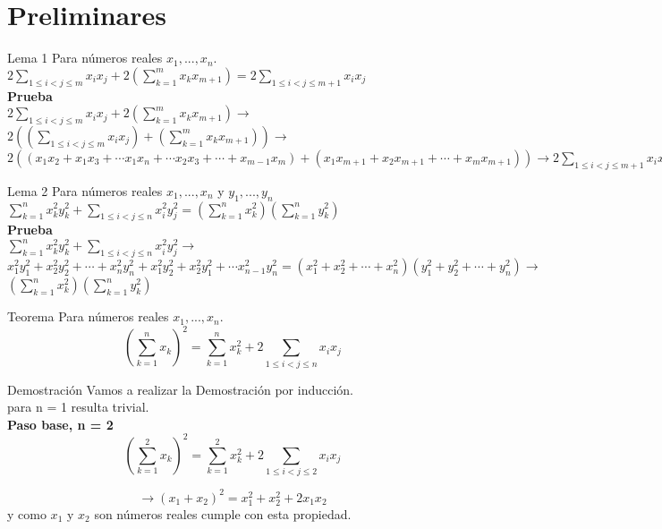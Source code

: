 \section{Preliminares}

\begin{frame}{Lema 1}
Para números reales $x_{1},...,x_{n}$.
$2 \sum_{1 \leq i<j \leq m}x_{i}x_{j} + 2(\sum_{k=1}^{m} x_{k}x_{m+1}) = 2 \sum_{1 \leq i<j \leq m+1}x_{i}x_{j}$ \\ 
\textbf{Prueba} \\ 
$2 \sum_{1 \leq i<j \leq m}x_{i}x_{j} + 2(\sum_{k=1}^{m} x_{k}x_{m+1}) \to $
$2((\sum_{1 \leq i<j \leq m}x_{i}x_{j}) + (\sum_{k=1}^{m} x_{k}x_{m+1}) ) \to $ \\
$2((x_{1}x_{2}+x_{1}x_{3}+ \cdots x_{1}x_{n} + \cdots x_{2}x_{3} + \cdots+x_{m-1}x_{m}) + (x_{1}x_{m+1}+x_{2}x_{m+1}+ \cdots+x_{m}x_{m+1}) ) \to 2 \sum_{1 \leq i<j \leq m+1} x_{i}x_{j}$ 
    
\end{frame}
\begin{frame}{Lema 2}
Para números reales $x_{1},...,x_{n}$ y $y_{1},...,y_{n}$ \\ 
$\sum_{k=1}^{n} x^{2}_{k}y^{2}_{k} +  \sum_{1 \leq i < j \leq n} x^{2}_{i}y^{2}_{j}  = (\sum_{k=1}^{n} x^{2}_{k})(\sum_{k=1}^{n} y^{2}_{k})$ \\
\textbf{Prueba} \\ 
$\sum_{k=1}^{n} x^{2}_{k}y^{2}_{k} +  \sum_{1 \leq i < j \leq n} x^{2}_{i}y^{2}_{j} \to$ \\
$x^{2}_{1}y^{2}_{1}+x^{2}_{2}y^{2}_{2}+\cdots+ x^{2}_{n}y^{2}_{n}+x^{2}_{1}y^{2}_{2}+x^{2}_{2}y^{2}_{1}+\cdots x^{2}_{n-1}y^{2}_{n} =(x^{2}_{1}+x^{2}_{2}+ \cdots + x^{2}_{n})(y^{2}_{1}+y^{2}_{2}+\cdots+y^{2}_{n}) \to $ \\ 
$(\sum_{k=1}^{n} x^{2}_{k})(\sum_{k=1}^{n} y^{2}_{k})$
\end{frame}

 
\begin{frame}{Teorema}
Para números reales $x_{1},...,x_{n}$.
\begin{equation*}
    (\sum_{k=1}^{n}x_{k})^{2} =  \sum_{k=1}^{n} x^{2}_{k} + 2 \sum_{1 \leq i < j \leq n}  x_{i}x_{j}
\end{equation*}
    
\end{frame}
\begin{frame}{Demostración}
Vamos a realizar la Demostración por inducción. \\
para n = 1 resulta trivial. \\
\textbf{Paso base, n = 2 }
\begin{equation}
    (\sum_{k=1}^{2} x_{k})^{2} = \sum_{k=1}^{2} x_{k}^{2} + 2 \sum_{1 \leq i<j \leq 2}x_{i}x_{j}
\end{equation}

\begin{equation}
    \to (x_{1}+x_{2})^{2} = x_{1}^{2}+x_{2}^{2}+2x_{1}x_{2} 
\end{equation}
y como $x_{1}$ y $x_{2}$ son números reales cumple con esta propiedad.
\end{frame}


